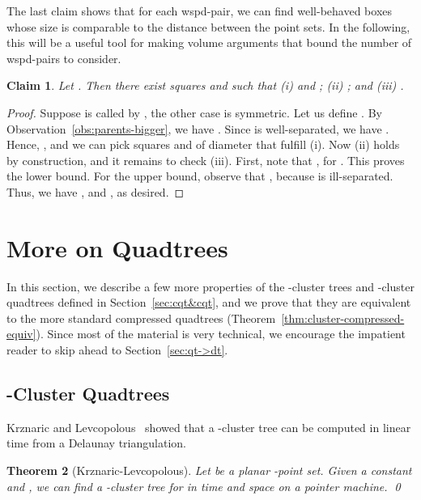 \documentclass[11pt]{paper}
\newtheorem {theorem} {Theorem}[section]
\newtheorem {claim}[theorem] {Claim}
\begin{document}
   The last claim shows that for each wspd-pair, we can find
   well-behaved boxes whose size is comparable to the distance
   between the point sets. In the following, this will be a useful tool
   for making volume arguments that bound the number of wspd-pairs to consider.
\begin{claim}\label{clm:quad-squares}
Let \emph{}.
Then there exist squares  and  such that
(i)  and
    ;
(ii) ;
and (iii) .
\end{claim}

\begin{proof}
Suppose  is called by
, the other case is symmetric.
Let us define .
By Observation~\ref{obs:parents-bigger},
we have .
 Since 
is well-separated, we have .
Hence, ,
and we can pick squares  and  of diameter  that fulfill (i).
Now (ii) holds by construction, and it remains to check (iii).
First, note that , for . This
proves the lower bound.
For the upper bound, observe that
, because 
is ill-separated. Thus, we have ,
and , as desired.
\end{proof}

    

\section{More on Quadtrees} \label {sec:qt}


  In this section, we describe a few more properties of the -cluster
  trees and -cluster quadtrees defined in Section~\ref{sec:cqt&cqt}, 
  and we prove that they are equivalent to the more standard compressed
  quadtrees (Theorem~\ref {thm:cluster-compressed-equiv}).
  Since most of the material is very technical, we encourage 
  the impatient reader to skip ahead to Section~\ref {sec:qt->dt}.

  \subsection {-Cluster Quadtrees} \label {sec:ccqt}

    
    Krznaric and Levcopolous~\cite[Theorem~7]{KrznaricLe95} showed that a
    -cluster tree can be computed in linear time from a Delaunay 
    triangulation.
    \begin{theorem}[Krznaric-Levcopolous]\label{thm:c-cluster-tree}
      Let  be a planar -point set.
      Given a constant  and , we can find a -cluster
      tree  for  in  time and space on a pointer machine.
      \qed
    \end{theorem}
\end{document}
